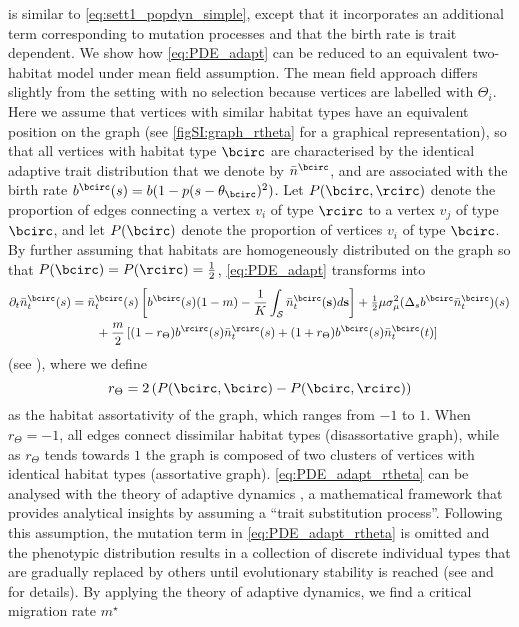  is similar to \cref{eq:sett1_popdyn_simple}, except that it incorporates an additional term corresponding to mutation processes and that the birth rate is trait dependent.
%
We show how \cref{eq:PDE_adapt} can be reduced to an equivalent two-habitat model under mean field assumption. 
%
The mean field approach differs slightly from the setting with no selection because vertices are labelled with $\Theta_i$. Here we assume that vertices with similar habitat types have an equivalent position on the graph (see \cref{figSI:graph_rtheta} for a graphical representation), so that all vertices with habitat type $\bcirc$ are characterised by the identical adaptive trait distribution that we denote by $\bar{n}^{{\bcirc}}$, and are associated with the birth rate $b^\bcirc(s) = b(1 - p(s - \theta_\bcirc)^2)$. Let $P({\bcirc},{\rcirc})$ denote the proportion of edges connecting a vertex $v_i$ of type $\rcirc$ to a vertex $v_j$ of type $\bcirc$, and let $P(\bcirc)$ denote the proportion of vertices $v_i$ of type $\bcirc$. 
%
By further assuming that habitats are homogeneously distributed on the graph so that $P({\bcirc}) = P({\rcirc}) = \tfrac{1}{2}$, \cref{eq:PDE_adapt} transforms into
\begin{equation}\label{eq:PDE_adapt_rtheta}
  \begin{split}
    \partial_t \bar{n}_t^{{\bcirc}}(s) &= \bar{n}_t^{{\bcirc}}(s)\left[ b^{{\bcirc}}(s) (1-m) - \frac{1}{K}\int_\mathcal{S}  \bar{n}_t^{{\bcirc}}({\textbf s}) d{\textbf s} \right] + \tfrac{1}{2} \mu \sigma_\mu^2 (\Delta_s b^{{\bcirc}} \bar{n}_t^{{\bcirc}})(s) \\
    & \qquad + \frac{m}{2} \, [ (1-r_\Theta)  b^{{\rcirc}}(s) \bar{n}_t^{{\rcirc}}(s) + (1 + r_\Theta)  b^{{\bcirc}}(s) \bar{n}_t^{{\bcirc}}(t)]\\
  \end{split}
\end{equation}
%
(see ), where we define
\begin{equation}\label{eq:r_theta_mf}
  r_\Theta = 2 \left( P({\bcirc},{\bcirc}) - P({\bcirc},{\rcirc}) \right)
\end{equation} 
as the habitat assortativity of the graph, which ranges from $-1$ to $1$.
%
When $r_\Theta = -1$, all edges connect dissimilar habitat types (disassortative graph), while as $r_\Theta$ tends towards $1$ the graph is composed of two clusters of vertices with identical habitat types (assortative graph).
%
\cref{eq:PDE_adapt_rtheta} can be analysed with the theory of adaptive dynamics \citep{Meszena1997,Debarre2013,Mirrahimi2020}, a mathematical framework that provides analytical insights by assuming a “trait substitution process”. Following this assumption, the mutation term in \cref{eq:PDE_adapt_rtheta} is omitted and the phenotypic distribution results in a collection of discrete individual types that are gradually replaced by others until evolutionary stability is reached (see  and \citep{Meszena1997,Debarre2013,Mirrahimi2020} for details). By applying the theory of adaptive dynamics, we find a critical migration rate $m^\star$
